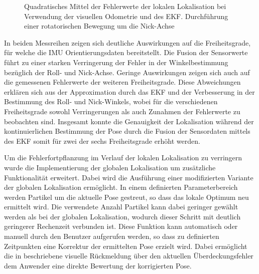 \begin{figure}[!ht]

\caption{Quadratisches Mittel der Fehlerwerte der lokalen Lokalisation bei Verwendung der visuellen Odometrie und des EKF. Durchführung einer rotatorischen Bewegung um die Nick-Achse}
\label{fig.loc_loc_rot_ekf_pitch}
\end{figure}


In beiden Messreihen zeigen sich deutliche Auswirkungen auf die Freiheitsgrade, für welche die IMU Orientierungsdaten bereitstellt. Die Fusion der Sensorwerte führt zu einer starken Verringerung der Fehler in der Winkelbestimmung bezüglich der Roll- und Nick-Achse. Geringe Auswirkungen zeigen sich auch auf die gemessenen Fehlerwerte der weiteren Freiheitsgrade. Diese Abweichungen erklären sich aus der Approximation durch das EKF und der Verbesserung in der Bestimmung des Roll- und Nick-Winkels, wobei für die verschiedenen Freiheitsgrade sowohl Verringerungen als auch Zunahmen der Fehlerwerte zu beobachten sind. Insgesamt konnte die Genauigkeit der Lokalisation während der kontinuierlichen Bestimmung der Pose durch die Fusion der Sensordaten mittels des EKF somit für zwei der sechs Freiheitsgrade erhöht werden.\\ 

\prever{
}

Um die Fehlerfortpflanzung im Verlauf der lokalen Lokalisation zu verringern wurde die Implementierung der globalen Lokalisation um zusätzliche Funktionalität erweitert. Dabei wird die Ausführung einer modifizierten Variante der globalen Lokalisation ermöglicht. In einem definierten Parameterbereich werden Partikel um die aktuelle Pose gestreut, so dass das lokale Optimum neu ermittelt wird. Die verwendete Anzahl Partikel kann dabei geringer gewählt werden als bei der globalen Lokalisation, wodurch dieser Schritt mit deutlich geringerer Rechenzeit verbunden ist. Diese Funktion kann automatisch oder manuell durch den Benutzer aufgerufen werden, so dass zu definierten Zeitpunkten eine Korrektur der ermittelten Pose erzielt wird. Dabei ermöglicht die in  beschriebene visuelle Rückmeldung über den aktuellen Überdeckungsfehler dem Anwender eine direkte Bewertung der korrigierten Pose.


